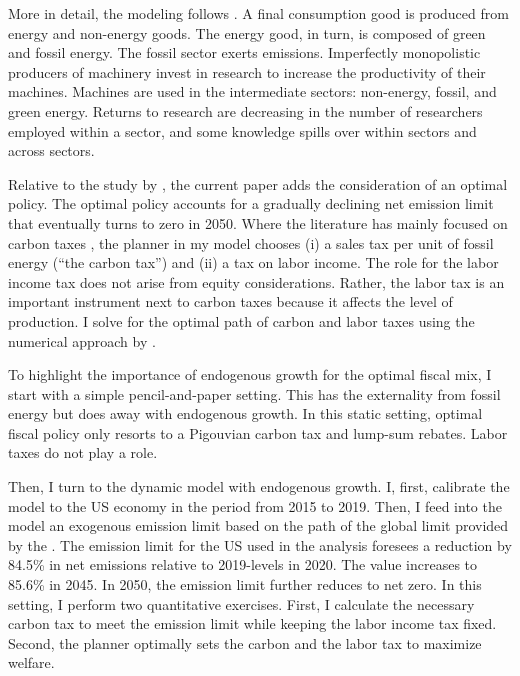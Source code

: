 More in detail, the modeling follows \cite{Fried2018ClimateAnalysis}. A final consumption good is produced from energy and non-energy goods. The energy good, in turn, is composed of green and fossil energy. The fossil sector exerts emissions. Imperfectly monopolistic producers of machinery invest in research to increase the productivity of their machines. Machines are used in the intermediate sectors: non-energy, fossil, and green energy. Returns to research are decreasing in the number of researchers employed within a sector, and some knowledge spills over within sectors and across sectors.

Relative to the study by \cite{Fried2018ClimateAnalysis}, the current paper adds the consideration of an optimal policy. The optimal policy accounts for a gradually declining  net emission limit that eventually turns to zero in 2050. Where the literature  has mainly focused on carbon taxes \citep{Acemoglu2012TheChange, Fried2018ClimateAnalysis}, the planner in my model chooses (i) a sales tax per unit of fossil energy (“the carbon tax”) and (ii) a tax on labor income. The role for the labor income tax does not arise from equity considerations. Rather, the labor tax is an important instrument next to carbon taxes because it affects the level of production.  I solve for the optimal path of carbon and labor taxes using the numerical approach by  \citep{Jones1993OptimalGrowth, Barrage2019OptimalPolicy}.

To highlight the importance of endogenous growth for the optimal fiscal mix, I start with a simple pencil-and-paper setting. This has the externality from fossil energy but does away with endogenous growth. In this static setting, optimal fiscal policy only resorts to a Pigouvian carbon tax and lump-sum rebates. Labor taxes do not play a role.

Then, I turn to the dynamic model with endogenous growth. I, first, calibrate the model to the US economy in the period from 2015 to 2019. Then, I feed into the model an exogenous emission limit based on the path of the global limit provided by the \cite{IPCC2022}. The emission limit for the US used in the analysis foresees a reduction by 84.5\% in net emissions relative to 2019-levels in 2020. The value increases to 85.6\% in 2045. In 2050, the emission limit further reduces to net zero. In this setting, I perform two quantitative exercises. First, I calculate the necessary carbon tax to meet the emission limit while keeping the labor income tax fixed. Second,  the planner optimally sets the carbon and the labor tax to maximize welfare.

